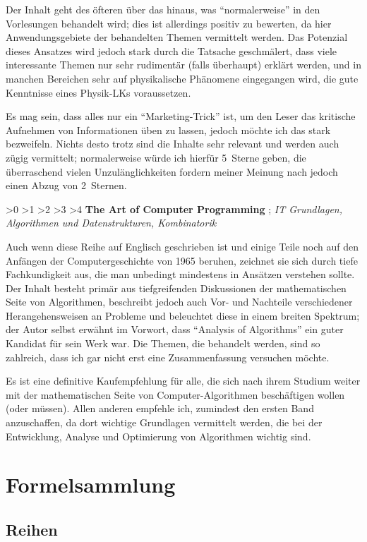 \documentclass[english,ngerman,fontsize=9pt,intoc,index=totoc,refpage,listof=totoc,draft]{scrbook}
\numberwithin{equation}{section}
\newcommand{\ratingstar}{{\footnotesize \FiveStarShadow}}
\newcommand{\rating}[4]{\noindent\begin{flushright}
  \null\hfilneg%
  \ifnum #1>0 \ratingstar \fi
  \ifnum #1>1 \ratingstar \fi
  \ifnum #1>2 \ratingstar \fi
  \ifnum #1>3 \ratingstar \fi
  \ifnum #1>4 \ratingstar \fi
  \hspace{0.6667em}
  \textbf{\sffamily #2 \hfil\mbox{}}%
  \hspace{0.6667em}
  \cite{#3}; \emph{#4}
\end{flushright}}
\begin{document}
Der Inhalt geht des öfteren über das hinaus, was \enquote{normalerweise} in den Vorlesungen behandelt wird; dies ist allerdings positiv zu bewerten, da hier Anwendungsgebiete der behandelten Themen vermittelt werden.
Das Potenzial dieses Ansatzes wird jedoch stark durch die Tatsache geschmälert, dass viele interessante Themen nur sehr rudimentär (falls überhaupt) erklärt werden, und in manchen Bereichen sehr auf physikalische Phänomene eingegangen wird, die gute Kenntnisse eines Physik-LKs voraussetzen.

Es mag sein, dass alles nur ein \enquote{Marketing-Trick} ist, um den Leser das kritische Aufnehmen von Informationen üben zu lassen, jedoch möchte ich das stark bezweifeln.
Nichts desto trotz sind die Inhalte sehr relevant und werden auch zügig vermittelt; normalerweise würde ich hierfür 5~Sterne geben, die überraschend vielen Unzulänglichkeiten fordern meiner Meinung nach jedoch einen Abzug von 2~Sternen.


\rating{5}{The Art of Computer Programming}
{TAOCP1,TAOCP2,TAOCP3,TAOCP4a}
{IT Grundlagen, Algorithmen und Datenstrukturen, Kombinatorik}

Auch wenn diese Reihe auf Englisch geschrieben ist und einige Teile noch auf den Anfängen der Computergeschichte von 1965 beruhen, zeichnet sie sich durch tiefe Fachkundigkeit aus, die man unbedingt mindestens in Ansätzen verstehen sollte.
Der Inhalt besteht primär aus tiefgreifenden Diskussionen der mathematischen Seite von Algorithmen, beschreibt jedoch auch Vor- und Nachteile verschiedener Herangehensweisen an Probleme und beleuchtet diese in einem breiten Spektrum; der Autor selbst erwähnt im Vorwort, dass \enquote{Analysis of Algorithms} ein guter Kandidat für sein Werk war.
Die Themen, die behandelt werden, sind so zahlreich, dass ich gar nicht erst eine Zusammenfassung versuchen möchte.

Es ist eine definitive Kaufempfehlung für alle, die sich nach ihrem Studium weiter mit der mathematischen Seite von Computer-Algorithmen beschäftigen wollen (oder müssen).
Allen anderen empfehle ich, zumindest den ersten Band anzuschaffen, da dort wichtige Grundlagen vermittelt werden, die bei der Entwicklung, Analyse und Optimierung von Algorithmen wichtig sind.


\chapter{Formelsammlung}

\section{Reihen}
\end{document}
